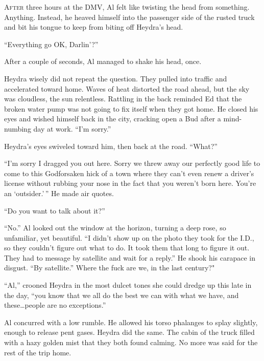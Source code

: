 
\lettrine{A}{fter} three hours at the DMV, Al felt like twisting the head from
something. Anything. Instead, he heaved himself into the passenger side
of the rusted truck and bit his tongue to keep from biting off Heydra's
head.

``Everything go OK, Darlin'?''

After a couple of seconds, Al managed to shake his head, once.

Heydra wisely did not repeat the question. They pulled into traffic and
accelerated toward home. Waves of heat distorted the road ahead, but the
sky was cloudless, the sun relentless. Rattling in the back reminded Ed
that the broken water pump was not going to fix itself when they got
home. He closed his eyes and wished himself back in the city, cracking
open a Bud after a mind-numbing day at work. ``I'm sorry.''

Heydra's eyes swiveled toward him, then back at the road. ``What?''

``I'm sorry I dragged you out here. Sorry we threw away our perfectly
good life to come to this Godforsaken hick of a town where they can't
even renew a driver's license without rubbing your nose in the fact that
you weren't born here. You're an `outsider.'\,'' He made air quotes.

``Do you want to talk about it?''

``No.'' Al looked out the window at the horizon, turning a deep rose, so
unfamiliar, yet beautiful. ``I didn't show up on the photo they took for
the I.D., so they couldn't figure out what to do. It took them that long
to figure it out. They had to message by satellite and wait for a
reply.'' He shook his carapace in disgust. ``By satellite.'' Where the
fuck are we, in the last century?"

``Al,'' crooned Heydra in the most dulcet tones she could dredge up this
late in the day, ``you know that we all do the best we can with what we
have, and these\ldots people are no exceptions.''

Al concurred with a low rumble. He allowed his torso phalanges to splay
slightly, enough to release pent gases. Heydra did the same. The cabin
of the truck filled with a hazy golden mist that they both found
calming. No more was said for the rest of the trip home.
